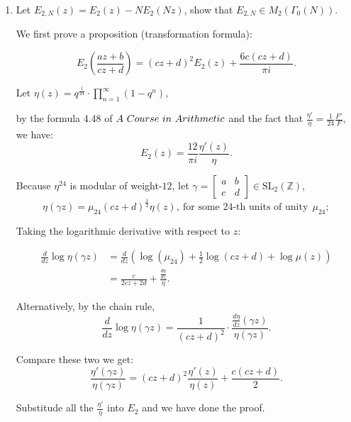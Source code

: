 \begin{enumerate}
\begin{proofc}[解答]
Then we have that all the cusps of $\Gamma_0(4)$ are $\big\{0, \frac12, \infty\big\}$.
\end{proofc}  

\item
Let $E_{2,N}(z) = E_2(z) - N E_{2}(Nz)$, show that $E_{2,N} \in M_2(\Gamma_0(N))$.


\begin{proofc}[解答]
    We first prove a proposition (transformation formula):
\begin{proposition}
   $$E_2(\frac{az+b}{cz+d}) = (cz+d)^2 E_2(z) + \frac{6c(cz+d)}{\pi i}.$$
\end{proposition}
Let $\displaystyle \eta(z) = q^{\frac{1}{24}}\cdot \prod_{n=1}^{\infty}(1-q^n)$,

by the formula 4.48 of $\mathnormal{A \ Course \ in \ Arithmetic}$ 
 and the fact that $\frac{\eta'}{\eta} = \frac{1}{24} \frac{F'}{F}$, 
 we have:
 $$E_2(z) = \frac{12}{\pi i}\frac{\eta'(z)}{\eta}.$$

Because $\eta^{24}$ is modular of weight-$12$, let $\gamma  = \begin{bmatrix}
    a & b \\
    c & d
\end{bmatrix} \in \mathrm{SL}_2(\mathbb{Z})$, 
$$\eta(\gamma z) = \mu_{24} (cz+d)^{\frac12}\eta(z),\  \text{for some 24-th units of unity} \ \  \mu_{24};$$

Taking the logarithmic derivative with respect to $z$:

\begin{align}
    \frac{d}{dz}\log \eta(\gamma z) &= \frac{d}{dz}(\log(\mu_{24}) + \frac12\log (cz+d) +\log \mu(z))\\
    &= \frac{c}{2cz+2d} + \frac{\frac{d \eta}{dz}}{\eta}.
\end{align}

Alternatively, by the chain rule,
$$\frac{d}{dz}\log \eta(\gamma z)  = \frac{1}{(cz+d)^2} \cdot \frac{\frac{d \eta}{dz}(\gamma z)}{\eta(\gamma z)}.$$

Compare these two we get:
$$\frac{\eta'(\gamma z)}{\eta(\gamma z )} = (cz+d)^2 \frac{\eta'(z)}{\eta(z)} + \frac{c(cz+d)}{2}.$$

Substitude all the $\frac{\eta'}{\eta}$ into $E_2$ and we have done the proof.


\end{proofc}
\end{enumerate}
